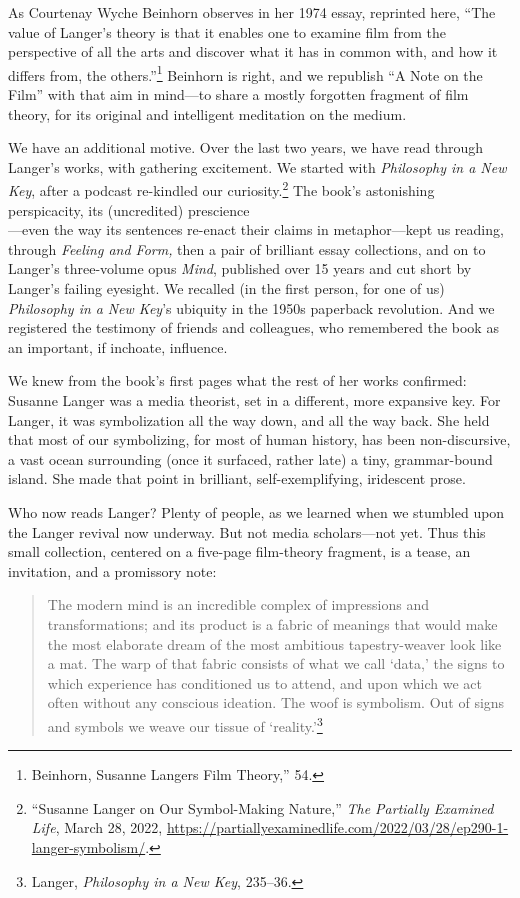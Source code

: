 \documentclass{tufte-handout}
\begin{document}
As Courtenay Wyche Beinhorn observes in her 1974 essay, reprinted here,
``The value of Langer's theory is that it enables one to examine film
from the perspective of all the arts and discover what it has in common
with, and how it differs from, the others.''\footnote{Beinhorn,
  Susanne Langers Film Theory,'' 54.} Beinhorn is right,
and we republish ``A Note on the Film'' with that aim in mind---to share
a mostly forgotten fragment of film theory, for its original and
intelligent meditation on the medium.

We have an additional motive. Over the last two years, we have read
through Langer's works, with gathering excitement. We started with
\emph{Philosophy in a New Key}, after a podcast re-kindled our
curiosity.\footnote{``Susanne Langer on Our Symbol-Making Nature,''
  \emph{The Partially Examined Life}, March 28, 2022,
  \url{https://partiallyexaminedlife.com/2022/03/28/ep290-1-langer-symbolism/}.}
The book's astonishing perspicacity, its (uncredited) prescience\\\noindent---even
the way its sentences re-enact their claims in metaphor---kept us
reading, through \emph{Feeling and Form,} then a pair of brilliant essay
collections, and on to Langer's three-volume opus \emph{Mind}, published
over 15 years and cut short by Langer's failing eyesight. We recalled
(in the first person, for one of us) \emph{Philosophy in a} \emph{New
Key}'s ubiquity in the 1950s paperback revolution. And we registered the
testimony of friends and colleagues, who remembered the book as an
important, if inchoate, influence.

We knew from the book's first pages what the rest of her works
confirmed: Susanne Langer was a media theorist, set in a different, more
expansive key. For Langer, it was symbolization all the way down, and
all the way back. She held that most of our symbolizing, for most of
human history, has been non-discursive, a vast ocean surrounding (once
it surfaced, rather late) a tiny, grammar-bound island. She made that
point in brilliant, self-exemplifying, iridescent prose.

Who now reads Langer? Plenty of people, as we learned when we stumbled
upon the Langer revival now underway. But not media scholars---not yet.
Thus this small collection, centered on a five-page film-theory
fragment, is a tease, an invitation, and a promissory note:

\begin{quote}
The modern mind is an incredible complex of impressions and
transformations; and its product is a fabric of meanings that would make
the most elaborate dream of the most ambitious tapestry-weaver look like
a mat. The warp of that fabric consists of what we call `data,' the
signs to which experience has conditioned us to attend, and upon which
we act often without any conscious ideation. The woof is symbolism. Out
of signs and symbols we weave our tissue of `reality.'\footnote{Langer,
  \emph{Philosophy in a New Key}, 235--36.}
\end{quote}
\end{document}
